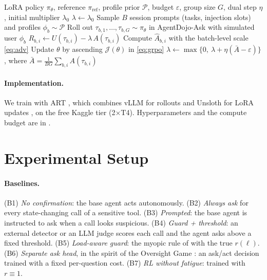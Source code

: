 \documentclass[10pt]{article}
\newcommand{\ADA}{AgentDojo-Ask\xspace}
\theoremstyle{plain}
\theoremstyle{definition}
\begin{document}
\begin{algorithm}[t]
\caption{Fatigue-aware GRPO-Lagrangian (FA-GRPO-L)}
\label{alg:fagrpo}
\begin{algorithmic}[1]
\Require LoRA policy $\pi_\theta$, reference $\pi_{\mathrm{ref}}$, profile prior $\mathcal{P}$, budget $\varepsilon$, group size $G$, dual step $\eta$, initial multiplier $\lambda_0$
\State $\lambda\gets\lambda_0$
  \State Sample $B$ session prompts (tasks, injection slots) and profiles $\phi_b\sim\mathcal P$
   
    \State Roll out $\tau_{b,1},\dots,\tau_{b,G}\sim\pi_\theta$ in \ADA with simulated user $\phi_b$
    \State $R_{b,i}\gets U(\tau_{b,i})-\lambda\,A(\tau_{b,i})$
  \EndFor
  \State Compute $\hat A_{b,i}$ with the batch-level scale \eqref{eq:adv}
  \State Update $\theta$ by ascending $\mathcal J(\theta)$ in \eqref{eq:grpo}
  \State $\lambda\gets\max\bigl\{0,\ \lambda+\eta(\bar A-\varepsilon)\bigr\}$, where $\bar A=\frac{1}{BG}\sum_{b,i}A(\tau_{b,i})$
\EndFor
\end{algorithmic}
\end{algorithm}

\paragraph{Implementation.} We train with ART \citep{hilton2025art}, which combines vLLM for rollouts \citep{kwon2023vllm} and Unsloth for LoRA updates \citep{unsloth2023}, on the free Kaggle tier (2$\times$T4). Hyperparameters and the compute budget are in .

\section{Experimental Setup}\label{sec:setup}

\paragraph{Baselines.} (B1) \emph{No confirmation}: the base agent acts autonomously. (B2) \emph{Always ask} for every state-changing call of a sensitive tool. (B3) \emph{Prompted}: the base agent is instructed to ask when a call looks suspicious. (B4) \emph{Guard + threshold}: an external detector \citep{meta2025promptguard2} or an LLM judge scores each call and the agent asks above a fixed threshold. (B5) \emph{Load-aware guard}: the myopic rule of  with the true $r(\ell)$. (B6) \emph{Separate ask head}, in the spirit of the Oversight Game \citep{overman2026oversight}: an ask/act decision trained with a fixed per-question cost. (B7) \emph{RL without fatigue}:  trained with $r\equiv1$.
\end{document}
